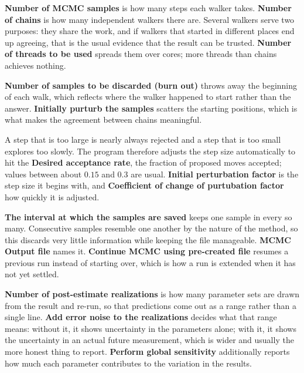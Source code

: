 \textbf{Number of MCMC samples} is how many steps each walker takes.
\textbf{Number of chains} is how many independent walkers there are. Several
walkers serve two purposes: they share the work, and if walkers that started in
different places end up agreeing, that is the usual evidence that the result can
be trusted. \textbf{Number of threads to be used} spreads them over cores; more
threads than chains achieves nothing.

\textbf{Number of samples to be discarded (burn out)} throws away the beginning
of each walk, which reflects where the walker happened to start rather than the
answer. \textbf{Initially purturb the samples} scatters the starting positions,
which is what makes the agreement between chains meaningful.

A step that is too large is nearly always rejected and a step that is too small
explores too slowly. The program therefore adjusts the step size automatically
to hit the \textbf{Desired acceptance rate}, the fraction of proposed moves
accepted; values between about $0.15$ and $0.3$ are usual. \textbf{Initial
perturbation factor} is the step size it begins with, and \textbf{Coefficient of
change of purtubation factor} how quickly it is adjusted.

\textbf{The interval at which the samples are saved} keeps one sample in every
so many. Consecutive samples resemble one another by the nature of the method,
so this discards very little information while keeping the file manageable.
\textbf{MCMC Output file} names it. \textbf{Continue MCMC using pre-created
file} resumes a previous run instead of starting over, which is how a run is
extended when it has not yet settled.

\textbf{Number of post-estimate realizations} is how many parameter sets are
drawn from the result and re-run, so that predictions come out as a range rather
than a single line. \textbf{Add error noise to the realizations} decides what
that range means: without it, it shows uncertainty in the parameters alone; with
it, it shows the uncertainty in an actual future measurement, which is wider and
usually the more honest thing to report. \textbf{Perform global sensitivity}
additionally reports how much each parameter contributes to the variation in the
results.

